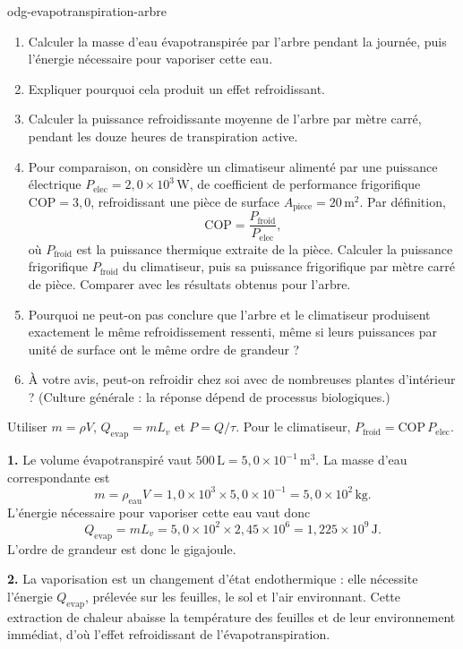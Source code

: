 \begin{exo}{odg-evapotranspiration-arbre}
\begin{enumerate}
  \item Calculer la masse d'eau évapotranspirée par l'arbre pendant la journée, puis l'énergie nécessaire pour vaporiser cette eau.
  \item Expliquer pourquoi cela produit un effet refroidissant.
  \item Calculer la puissance refroidissante moyenne de l'arbre par mètre carré, pendant les douze heures de transpiration active.
  \item Pour comparaison, on considère un climatiseur alimenté par une puissance électrique $P_{\mathrm{elec}}=2{,}0\times10^3\,\text{W}$, de coefficient de performance frigorifique $\mathrm{COP}=3{,}0$, refroidissant une pièce de surface $A_{\mathrm{piece}}=20\,\text{m}^2$. Par définition,
\[
\mathrm{COP}=\frac{P_{\text{froid}}}{P_{\mathrm{elec}}},
\]
où $P_{\text{froid}}$ est la puissance thermique extraite de la pièce.
 Calculer la puissance frigorifique $P_{\text{froid}}$ du climatiseur, puis sa puissance frigorifique par mètre carré de pièce. Comparer avec les résultats obtenus pour l'arbre.
  \item Pourquoi ne peut-on pas conclure que l'arbre et le climatiseur produisent exactement le même refroidissement ressenti, même si leurs puissances par unité de surface ont le même ordre de grandeur ?
  \item À votre avis, peut-on refroidir chez soi avec de nombreuses plantes d'intérieur ? (Culture générale : la réponse dépend de processus biologiques.)
\end{enumerate}

\begin{indication}
Utiliser $m=\rho V$, $Q_{\mathrm{evap}}=mL_v$ et $P=Q/\tau$. Pour le climatiseur, $P_{\text{froid}}=\mathrm{COP}\,P_{\mathrm{elec}}$.
\end{indication}

\begin{solution}
\textbf{1.} Le volume évapotranspiré vaut $500\,\text{L}=5{,}0\times10^{-1}\,\text{m}^3$. La masse d'eau correspondante est
\[
m=\rho_{\text{eau}}V
=1{,}0\times10^3\times5{,}0\times10^{-1}
=5{,}0\times10^2\,\text{kg}.
\]
L'énergie nécessaire pour vaporiser cette eau vaut donc
\[
Q_{\mathrm{evap}}=mL_v
=5{,}0\times10^2\times2{,}45\times10^6
=1{,}225\times10^9\,\text{J}.
\]
L'ordre de grandeur est donc le gigajoule.

\textbf{2.} La vaporisation est un changement d'état endothermique : elle nécessite l'énergie $Q_{\mathrm{evap}}$, prélevée sur les feuilles, le sol et l'air environnant. Cette extraction de chaleur abaisse la température des feuilles et de leur environnement immédiat, d'où l'effet refroidissant de l'évapotranspiration.


\end{solution}
\end{exo}
